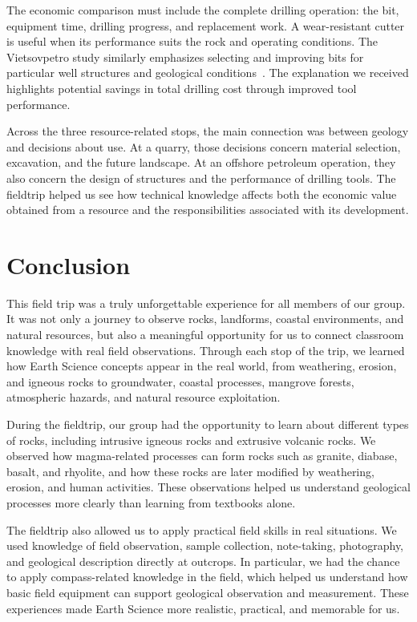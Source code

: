 \documentclass[11pt, a4paper]{article}
\begin{document}
The economic comparison must include the complete drilling operation: the bit, equipment time, drilling progress, and replacement work. A wear-resistant cutter is useful when its performance suits the rock and operating conditions. The Vietsovpetro study similarly emphasizes selecting and improving bits for particular well structures and geological conditions~\cite{vietsov-pdc}. The explanation we received highlights potential savings in total drilling cost through improved tool performance.

Across the three resource-related stops, the main connection was between geology and decisions about use. At a quarry, those decisions concern material selection, excavation, and the future landscape. At an offshore petroleum operation, they also concern the design of structures and the performance of drilling tools. The fieldtrip helped us see how technical knowledge affects both the economic value obtained from a resource and the responsibilities associated with its development.

\section{Conclusion}
This field trip was a truly unforgettable experience for all members of our group. It was not only a journey to observe rocks, landforms, coastal environments, and natural resources, but also a meaningful opportunity for us to connect classroom knowledge with real field observations. Through each stop of the trip, we learned how Earth Science concepts appear in the real world, from weathering, erosion, and igneous rocks to groundwater, coastal processes, mangrove forests, atmospheric hazards, and natural resource exploitation.

During the fieldtrip, our group had the opportunity to learn about different types of rocks, including intrusive igneous rocks and extrusive volcanic rocks. We observed how magma-related processes can form rocks such as granite, diabase, basalt, and rhyolite, and how these rocks are later modified by weathering, erosion, and human activities. These observations helped us understand geological processes more clearly than learning from textbooks alone.

The fieldtrip also allowed us to apply practical field skills in real situations. We used knowledge of field observation, sample collection, note-taking, photography, and geological description directly at outcrops. In particular, we had the chance to apply compass-related knowledge in the field, which helped us understand how basic field equipment can support geological observation and measurement. These experiences made Earth Science more realistic, practical, and memorable for us.
\end{document}
